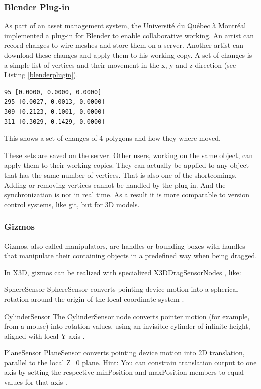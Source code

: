 \subsubsection{Blender Plug-in}
\label{blender-plugin}

As part of an asset management system, the Université du Québec à
Montréal implemented a plug-in for Blender to enable collaborative working. An
artist can record changes to wire-meshes and store them on a server.
Another artist can download these changes and apply them to his working
copy. A set of changes is a simple list of vertices and their movement in the
x, y and z direction (see Listing \ref{blenderplugin}). \cite{LCR07}

\begin{listing}
  \begin{verbatim}
95 [0.0000, 0.0000, 0.0000]
295 [0.0027, 0.0013, 0.0000]
309 [0.2123, 0.1001, 0.0000]
311 [0.3029, 0.1429, 0.0000]
  \end{verbatim}
  \caption{This shows a set of changes of 4 polygons and how they where moved.}
  \label{blenderplugin}
\end{listing}

These sets are saved on the server. Other users, working on the same
object, can apply them to their working copies. They can actually be applied
to any object that has the same number of vertices. That is also one of the
shortcomings. Adding or removing vertices cannot be handled by the
plug-in. And the synchronization is not in real time. As a result it is more comparable to version
control systems, like \gls{git}, but for \gls{3D} models.

\subsubsection{Gizmos}\label{gizmos}

Gizmos, also called manipulators, are handles or bounding boxes with
handles that manipulate their containing objects in a predefined way when
being dragged. \cite{wikigizmo}

In \gls{X3D}, gizmos can be realized with specialized X3DDragSensorNodes \cite{x3ddragsensornode}, like:

\begin{description*}
\item[SphereSensor]
  SphereSensor converts pointing device motion into a spherical rotation around the origin of the local coordinate system \cite{spheresensor}.
\item[CylinderSensor]
  The CylinderSensor node converts pointer motion (for example, from a mouse) into rotation values, using an invisible cylinder of infinite height, aligned with local Y-axis \cite{cylindersensor}.
\item[PlaneSensor]
  PlaneSensor converts pointing device motion into 2D translation, parallel to the local Z=0 plane. Hint: You can constrain translation output to one axis by setting the respective minPosition and maxPosition members to equal values for that axis \cite{planesensor}.
\end{description*}

